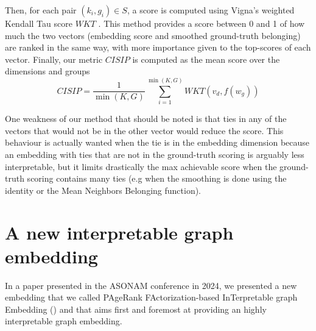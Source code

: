 Then, for each pair $(k_i, g_i) \in S$, a score is computed using Vigna's weighted Kendall Tau score $WKT$ \cite{vigna_2015}. This method provides a score between 0 and 1 of how much the two vectors (embedding score and smoothed ground-truth belonging) are ranked in the same way, with more importance given to the top-scores of each vector. Finally, our metric $CISIP$ is computed as the mean score over the dimensions and groups
\begin{equation}
    CISIP = \frac{1}{\min(K, G)}\sum_{i=1}^{\min(K, G)}WKT(v_d, f(w_g))
\end{equation}

One weakness of our method that should be noted is that ties in any of the vectors that would not be in the other vector would reduce the score. This behaviour is actually wanted when the tie is in the embedding dimension because an embedding with ties that are not in the ground-truth scoring is arguably less interpretable, but it limits drastically the max achievable score when the ground-truth scoring contains many ties (e.g when the smoothing is done using the identity or the Mean Neighbors Belonging function).

\section{A new interpretable graph embedding}%

In a paper presented in the ASONAM conference in 2024, we presented a new embedding that we called PAgeRank FActorization-based InTerpretable graph Embedding (\parfaite) and that aims first and foremost at providing an highly interpretable graph embedding.

